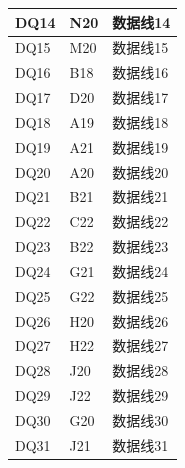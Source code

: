 \documentclass[12pt]{article}
\begin{document}
\begin{longtable}{|C{2cm}|C{3cm}|C{3cm}|}
\hline
DQ14 & N20 & 数据线14 \\
\hline
DQ15 & M20 & 数据线15 \\
\hline
DQ16 & B18 & 数据线16 \\
\hline
DQ17 & D20 & 数据线17 \\
\hline
DQ18 & A19 & 数据线18 \\
\hline
DQ19 & A21 & 数据线19 \\
\hline
DQ20 & A20 & 数据线20 \\
\hline
DQ21 & B21 & 数据线21 \\
\hline
DQ22 & C22 & 数据线22 \\
\hline
DQ23 & B22 & 数据线23 \\
\hline
DQ24 & G21 & 数据线24 \\
\hline
DQ25 & G22 & 数据线25 \\
\hline
DQ26 & H20 & 数据线26 \\
\hline
DQ27 & H22 & 数据线27 \\
\hline
DQ28 & J20 & 数据线28 \\
\hline
DQ29 & J22 & 数据线29 \\
\hline
DQ30 & G20 & 数据线30 \\
\hline
DQ31 & J21 & 数据线31 \\
\hline
\end{longtable}
\end{document}
